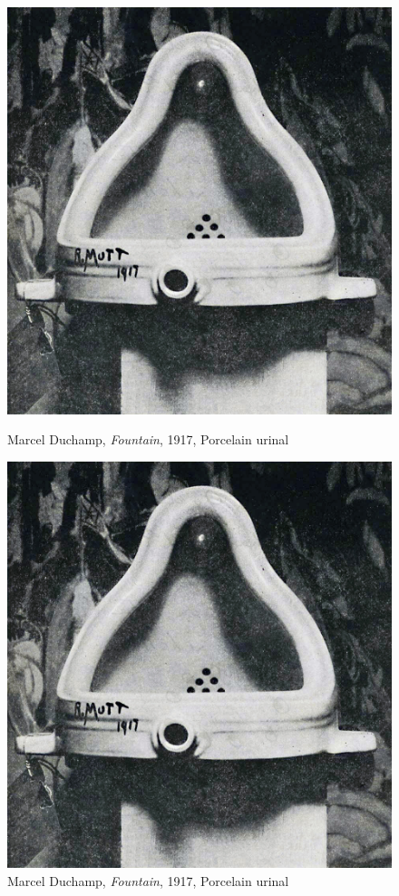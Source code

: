 \begin{figure}[!tbp]
  \centering
  \begin{minipage}[b]{0.48\textwidth}
    \includegraphics[width=\textwidth]{graphics/Duchamp_Fountaine.jpg}
    \caption{Marcel Duchamp, \textit{Fountain}, 1917, Porcelain urinal}
    \label{fig:Duchamp_Fountaine02}
  \end{minipage}
  \hfill
  \begin{minipage}[b]{0.48\textwidth}
    \includegraphics[width=\textwidth]{graphics/Duchamp_Fountaine.jpg}
    \caption{Marcel Duchamp, \textit{Fountain}, 1917, Porcelain urinal}
    \label{fig:Duchamp_Fountaine03}
  \end{minipage}
\end{figure}